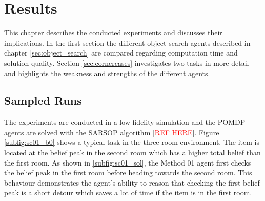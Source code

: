 \chapter{Results}
\label{sec:results}

This chapter describes the conducted experiments and discusses their implications. In the first section the different object search agents described in chapter \ref{sec:object_search} are compared regarding computation time and solution quality. Section \ref{sec:cornercases} investigates two tasks in more detail and highlights the weakness and strengths of the different agents.

\section{Sampled Runs}
The experiments are conducted in a low fidelity simulation and the POMDP agents are solved with the SARSOP algorithm [\textcolor{red}{REF HERE}]. Figure \ref{subfig:sc01_b0} shows a typical task in the three room environment. The item is located at the belief peak in the second room which has a higher total belief than the first room. As shown in \ref{subfig:sc01_sol}, the Method 01 agent first checks the belief peak in the first room before heading towards the second room. This behaviour demonstrates the agent's ability to reason that checking the first belief peak is a short detour which saves a lot of time if the item is in the first room.\\

